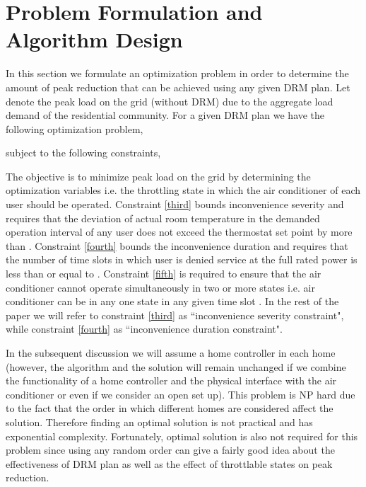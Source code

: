 \documentclass[10pt,twocolumn,twoside]{IEEEtran}
\begin{document}
\section{Problem Formulation and Algorithm Design}
In this section we formulate an optimization problem in order to determine the amount of peak reduction that can be achieved using any given DRM plan. Let  denote the peak load on the grid (without DRM) due to the aggregate load demand of the residential community. For a given DRM plan we have the following optimization problem,

subject to the following constraints,
\begin{center}

\end{center}
\begin{center}

\end{center}

The objective is to minimize peak load on the grid by determining the optimization variables  i.e. the throttling state  in which the air conditioner of each user  should be operated. Constraint \eqref{third} bounds inconvenience severity and requires that the deviation of actual room temperature in the demanded operation interval of any user does not exceed the thermostat set point by more than . Constraint \eqref{fourth} bounds the inconvenience duration and requires that the number of time slots in which user  is denied service at the full rated power is less than or equal to . Constraint \eqref{fifth} is required to ensure that the air conditioner cannot operate simultaneously in two or more states i.e. air conditioner can be in any one state  in any given time slot . In the rest of the paper we will refer to constraint \eqref{third} as ``inconvenience severity constraint", while constraint \eqref{fourth} as ``inconvenience duration constraint".

In the subsequent discussion we will assume a home controller in each home (however, the algorithm and the solution will remain unchanged if we combine the functionality of a home controller and the physical interface with the air conditioner or even if we consider an open set up). This problem is NP hard due to the fact that the order in which different homes are considered affect the solution. Therefore finding an optimal solution is not practical and has exponential complexity. Fortunately, optimal solution is also not required for this problem since using any random order can give a fairly good idea about the effectiveness of DRM plan as well as the effect of throttlable states on peak reduction.
\end{document}
